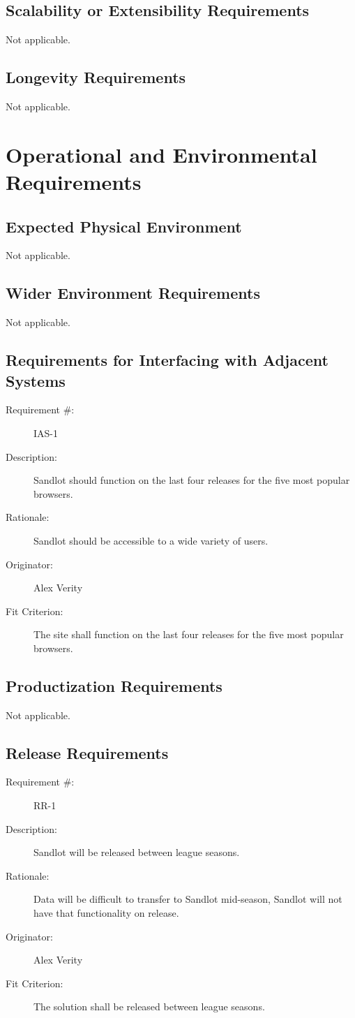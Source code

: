 \documentclass[12pt]{article}
\newenvironment{myreq}[1]{%
\setlist[description]{font=\normalfont\color{darkgray}}%
\begin{tcolorbox}[colframe=black,colback=white, sharp corners, boxrule=1pt]%
\bfseries\color{blue}%
\begin{description}#1}%
{\end{description}\end{tcolorbox}}
\newcommand{\twoinline}[2]{\begin{multicols}{2}#1 #2\end{multicols}}
\newcommand{\reqno}{\item[Requirement \#:]}
\newcommand{\reqdesc}{\item[Description:]}
\newcommand{\reqrat}{\item[Rationale:]}
\newcommand{\reqorig}{\item[Originator:]}
\newcommand{\reqfit}{\item[Fit Criterion:]}
\newcommand{\reqsatis}{\item[Customer Satisfaction:]}
\newcommand{\reqdissat}{\item[Customer Dissatisfaction:]}
\begin{document}
\subsection{Scalability or Extensibility Requirements}
Not applicable.
\subsection{Longevity Requirements}
Not applicable.

\section{Operational and Environmental Requirements}
\subsection{Expected Physical Environment}
Not applicable.
\subsection{Wider Environment Requirements}
Not applicable.
\subsection{Requirements for Interfacing with Adjacent Systems}

\begin{myreq}
  \reqno IAS-1
  \reqdesc Sandlot should function on the last four releases for the five
  most popular browsers.
  \reqrat Sandlot should be accessible to a wide variety of users.
  \reqorig Alex Verity
  \reqfit The site shall function on the last four releases for the five most
  popular browsers.
  \twoinline
    {\reqsatis 2}
    {\reqdissat 4}
\end{myreq}

\subsection{Productization Requirements}
Not applicable.
\subsection{Release Requirements}

\begin{myreq}
  \reqno RR-1
  \reqdesc Sandlot will be released between league seasons.
  \reqrat Data will be difficult to transfer to Sandlot mid-season, Sandlot
  will not have that functionality on release.
  \reqorig Alex Verity
  \reqfit The solution shall be released between league seasons.
  \twoinline
    {\reqsatis 2}
    {\reqdissat 2}
\end{myreq}
\end{document}
